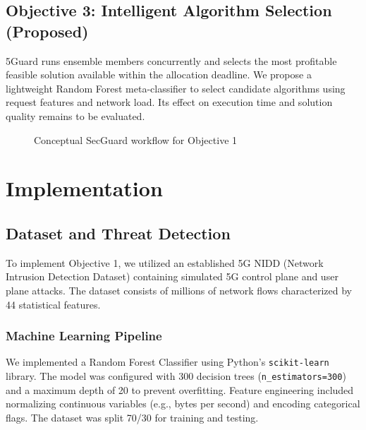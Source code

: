 \subsection{Objective 3: Intelligent Algorithm Selection (Proposed)}
5Guard runs ensemble members concurrently and selects the most profitable feasible solution available within the allocation deadline. We propose a lightweight Random Forest meta-classifier to select candidate algorithms using request features and network load. Its effect on execution time and solution quality remains to be evaluated.

\begin{figure}[h!]
\centering
{}
\caption{Conceptual SecGuard workflow for Objective 1}
\label{fig:arch}
\end{figure}

\clearpage

\section{Implementation}\label{sec:implementation}
\subsection{Dataset and Threat Detection}
To implement Objective 1, we utilized an established 5G NIDD (Network Intrusion Detection Dataset) containing simulated 5G control plane and user plane attacks. 
The dataset consists of millions of network flows characterized by 44 statistical features.

\subsubsection{Machine Learning Pipeline}
We implemented a Random Forest Classifier using Python's \texttt{scikit-learn} library. The model was configured with 300 decision trees (\texttt{n\_estimators=300}) and a maximum depth of 20 to prevent overfitting. 
Feature engineering included normalizing continuous variables (e.g., bytes per second) and encoding categorical flags. The dataset was split 70/30 for training and testing.

